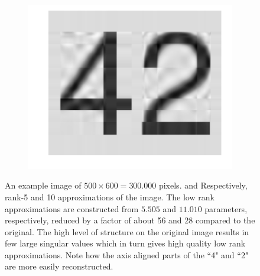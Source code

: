 \begin{figure}[tbp!]
\begin{subfigure}[b]{0.325\textwidth}
        \caption{}
        \label{fig: Theory: SVD-42-5}
    \end{subfigure}
    \hfill
    \begin{subfigure}[b]{0.325\textwidth}
        \centering
        \includegraphics[width=\textwidth]{graphics/svd/42-10.pdf}
        \caption{}
        \label{fig: Theory: SVD-42-10}
    \end{subfigure}
    \caption{
         An example image of $500\times600=300.000$ pixels.
         and  Respectively, rank-5 and 10 approximations of the image.
        The low rank approximations are constructed from $5.505$ and $11.010$ parameters, respectively, reduced by a factor of about 56 and 28 compared to the original.
        The high level of structure on the original image results in few large singular values which in turn gives high quality low rank approximations. Note how the axis aligned parts of the ``4" and ``2" are more easily reconstructed.
    }
    \label{fig: Theory: SVD number 42}
\end{figure}
